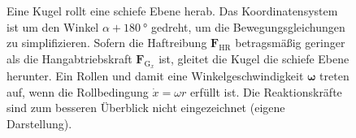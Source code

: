 \begin{figure}[htbp]
\begin{tikzpicture}[
	scale=1,
	ka roehre/.style={fill=white,draw=black!80}
]
\end{tikzpicture}
  \caption[Rollende Kugel auf einer schiefen Ebene]{Eine Kugel rollt eine schiefe Ebene herab. Das Koordinatensystem ist um den Winkel $\alpha +\SI{180}{\degree}$ gedreht, um die Bewegungsgleichungen zu simplifizieren. Sofern die Haftreibung $\boldsymbol{F}_\mathrm{HR}$ betragsmäßig geringer als die Hangabtriebskraft $\boldsymbol{F}_{\mathrm{G}_x}$ ist, gleitet die Kugel die schiefe Ebene herunter. Ein Rollen und damit eine Winkelgeschwindigkeit $\boldsymbol{\omega}$ treten auf, wenn die Rollbedingung $\dot{x}=\omega r$ erfüllt ist. Die Reaktionskräfte sind zum besseren Überblick nicht eingezeichnet (eigene Darstellung).}
  \label{fig:rampe1}
  \vspace{-0pt}
\end{figure}
